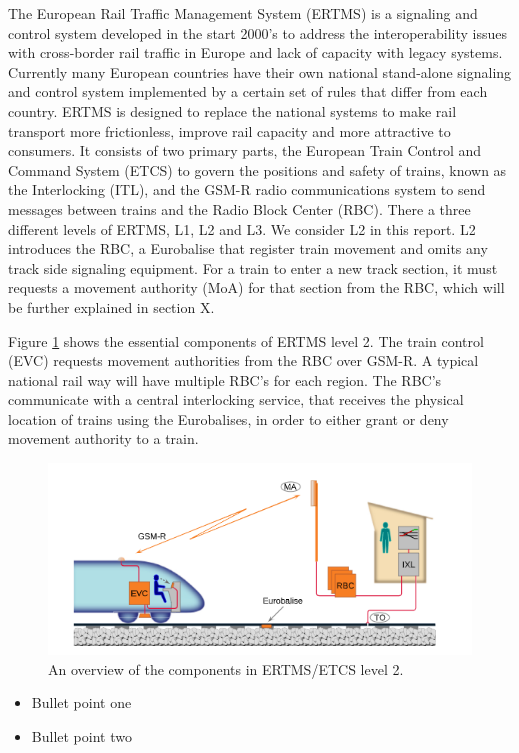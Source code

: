 \documentclass[preprint,12pt]{elsarticle}
\begin{document}
The European Rail Traffic Management System (ERTMS) is a signaling and control system developed in the start 2000's to address the interoperability issues with cross-border rail traffic in Europe and lack of capacity with legacy systems. Currently many European countries have their own national stand-alone signaling and control system implemented by a certain set of rules that differ from each country. ERTMS is designed to replace the national systems to make rail transport more frictionless, improve rail capacity and more attractive to consumers. It consists of two primary parts, the European Train Control and Command System (ETCS) to govern the positions and safety of trains, known as the Interlocking (ITL), and the GSM-R radio communications system to send messages between trains and the Radio Block Center (RBC). There a three different levels of ERTMS, L1, L2 and L3. We consider L2 in this report. L2 introduces the RBC, a Eurobalise that register train movement and omits any track side signaling equipment. For a train to enter a new track section, it must requests a movement authority (MoA) for that section from the RBC, which will be further explained in section X.

Figure \ref{fig:ertmsoverview} shows the essential components of ERTMS level 2. The train control (EVC) requests movement authorities from the RBC over GSM-R. A typical national rail way will have multiple RBC's for each region. The RBC's communicate with a central interlocking service, that receives the physical location of trains using the Eurobalises, in order to either grant or deny movement authority to a train.

\begin{figure}[h]
	\centering
	\includegraphics[width=0.8\linewidth]{ERTMS.png}
	\caption{An overview of the components in ERTMS/ETCS level 2.}
	\label{fig:ertmsoverview}
\end{figure}




\begin{itemize}
\item Bullet point one
\item Bullet point two
\end{itemize}
\end{document}

